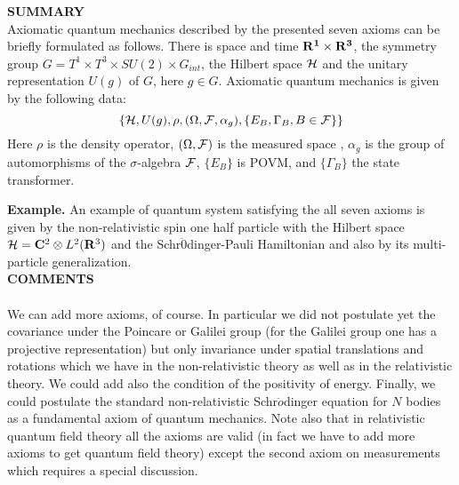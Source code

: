 \documentclass[12pt]{article}
\begin{document}
{\bf SUMMARY}\\

Axiomatic quantum mechanics described by the presented seven
axioms can be briefly formulated as follows. There is space and
time ${\bf R^1}\times {\bf R^3}$, the symmetry group $G=T^1\times
T^3\times SU(2)\times G_{int}$, the Hilbert space ${\cal H}$ and
the unitary representation $U(g)$ of $G$, here $g\in G.$ Axiomatic
quantum mechanics is given by the following data:
$$
\{{\cal H}, U(g), \rho, (\Omega,{\cal F}, \alpha_g),
\{E_B,\Gamma_B, B\in {\cal F}\}\}
$$
Here $\rho$ is the density operator, $(\Omega,{\cal F})$ is the
measured space , $\alpha_g$ is the group of automorphisms of the
$\sigma$-algebra ${\cal F}$, $\{E_B\}$ is POVM, and $\{\Gamma_B\}$
the state transformer.

 {\bf Example.} An example of quantum system
satisfying the all seven axioms is given by the non-relativistic
spin one half particle with the Hilbert space ${\cal H}={\bf
C}^2\otimes L^2({\bf R}^3)$ and the Schr$\ddot{0}$dinger-Pauli
Hamiltonian and also by
its multi-particle generalization.\\

{\bf COMMENTS}\\~\\
We can add more axioms, of course. In particular we did not
postulate yet the covariance under the Poincare or  Galilei group
(for the Galilei group one has a projective representation) but
only invariance under spatial translations and rotations which we
have in the non-relativistic theory as well as in the relativistic
theory. We could add also the condition of the positivity of
energy. Finally, we could postulate the standard non-relativistic
Schr$\ddot{o}$dinger equation for $N$ bodies  as a fundamental
axiom of quantum mechanics. Note also that in relativistic quantum
field theory all the axioms are valid (in fact we have to add more
axioms to get quantum field theory) except the second axiom on
measurements which requires a special discussion.
\end{document}
